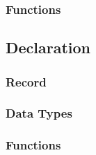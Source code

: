 \subsubsection{Functions}

\subsection{Declaration}
\subsubsection{Record}

\subsubsection{Data Types}

\subsubsection{Functions}